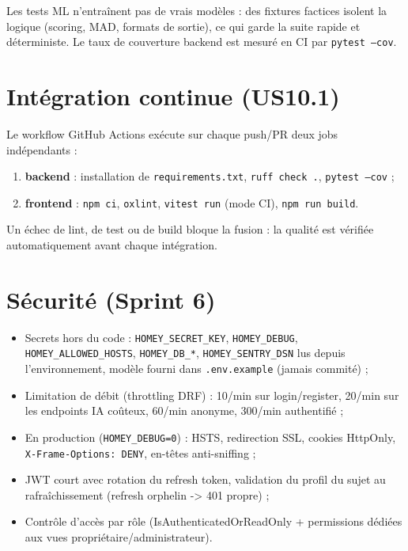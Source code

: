 \documentclass[11pt,a4paper]{report}
\begin{document}
Les tests ML n'entraînent pas de vrais modèles : des fixtures factices isolent la logique
(scoring, MAD, formats de sortie), ce qui garde la suite rapide et déterministe. Le taux de
couverture backend est mesuré en CI par \texttt{pytest --cov}.

\section{Intégration continue (US10.1)}
Le workflow GitHub Actions exécute sur chaque push/PR deux jobs indépendants :
\begin{enumerate}[leftmargin=*]
  \item \textbf{backend} : installation de \texttt{requirements.txt}, \texttt{ruff check .},
        \texttt{pytest --cov} ;
  \item \textbf{frontend} : \texttt{npm ci}, \texttt{oxlint}, \texttt{vitest run} (mode CI),
        \texttt{npm run build}.
\end{enumerate}
Un échec de lint, de test ou de build bloque la fusion : la qualité est vérifiée automatiquement
avant chaque intégration.

\section{Sécurité (Sprint 6)}
\begin{itemize}[leftmargin=*]
  \item Secrets hors du code : \texttt{HOMEY\_SECRET\_KEY}, \texttt{HOMEY\_DEBUG},
        \texttt{HOMEY\_ALLOWED\_HOSTS}, \texttt{HOMEY\_DB\_*}, \texttt{HOMEY\_SENTRY\_DSN}
        lus depuis l'environnement, modèle fourni dans \texttt{.env.example} (jamais commité) ;
  \item Limitation de débit (throttling DRF) : 10/min sur login/register, 20/min sur les
        endpoints IA coûteux, 60/min anonyme, 300/min authentifié ;
  \item En production (\texttt{HOMEY\_DEBUG=0}) : HSTS, redirection SSL, cookies HttpOnly,
        \texttt{X-Frame-Options: DENY}, en-têtes anti-sniffing ;
  \item JWT court avec rotation du refresh token, validation du profil du sujet au
        rafraîchissement (refresh orphelin -> 401 propre) ;
  \item Contrôle d'accès par rôle (IsAuthenticatedOrReadOnly + permissions dédiées aux vues
        propriétaire/administrateur).
\end{itemize}

\end{document}
